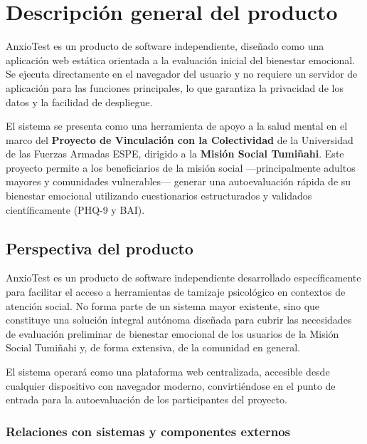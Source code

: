 \section{Descripción general del producto}
\label{sec:descripcion_general}

AnxioTest es un producto de software independiente, diseñado como una aplicación web estática orientada a la evaluación inicial del bienestar emocional. Se ejecuta directamente en el navegador del usuario y no requiere un servidor de aplicación para las funciones principales, lo que garantiza la privacidad de los datos y la facilidad de despliegue.

El sistema se presenta como una herramienta de apoyo a la salud mental en el marco del \textbf{Proyecto de Vinculación con la Colectividad} de la Universidad de las Fuerzas Armadas ESPE, dirigido a la \textbf{Misión Social Tumiñahi}. Este proyecto permite a los beneficiarios de la misión social —principalmente adultos mayores y comunidades vulnerables— generar una autoevaluación rápida de su bienestar emocional utilizando cuestionarios estructurados y validados científicamente (PHQ-9 y BAI).

\subsection{Perspectiva del producto}
\label{sec:perspectiva_producto}

AnxioTest es un producto de software independiente desarrollado específicamente para facilitar el acceso a herramientas de tamizaje psicológico en contextos de atención social. No forma parte de un sistema mayor existente, sino que constituye una solución integral autónoma diseñada para cubrir las necesidades de evaluación preliminar de bienestar emocional de los usuarios de la Misión Social Tumiñahi y, de forma extensiva, de la comunidad en general.

El sistema operará como una plataforma web centralizada, accesible desde cualquier dispositivo con navegador moderno, convirtiéndose en el punto de entrada para la autoevaluación de los participantes del proyecto.

\subsubsection{Relaciones con sistemas y componentes externos}

